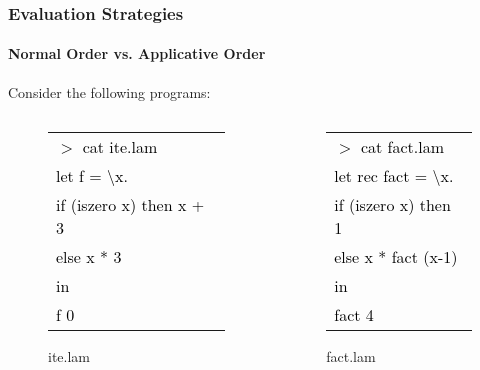 \documentclass[xcolor=table]{beamer}
\newcommand{\tab}{\hspace*{1.2em}}
\begin{document}
\begin{frame}
\frametitle{Evaluation Strategies}
\framesubtitle{Normal Order vs. Applicative Order}
\begin{block}{Consider the following programs:
  \begin{columns}[t] %
     \begin{column}[T]{5cm} %
          \begin{figure}[h!]
				 \begin{footnotesize}
				 \begin{tabular}{l}
				 \textcolor{black}{
			      $>$ cat ite.lam} \\
			      \textcolor{black}{let f = \textbackslash x.} \\ 
			      \textcolor{black}{\tab  if (iszero x) then x + 3} \\
				  \textcolor{black}{\tab  else x * 3} \\
			      \textcolor{black}{in} \\
			      \textcolor{black}{\tab f 0} \\
			      \end{tabular}	
				 \end{footnotesize}
			  \caption{ite.lam}
		 \end{figure}
     \end{column}
     \begin{column}[T]{5cm} %
		 \begin{figure}[h!]
				\begin{footnotesize}
				\rowcolors{1}{gray}{gray}
			  	\begin{tabular}{l}
			  	 \textcolor{black}{
			      $>$ cat fact.lam} \\
			      \textcolor{black}{let rec fact = \textbackslash x. } \\ 
			      \textcolor{black}{\tab if (iszero x) then 1} \\ 
			      \textcolor{black}{\tab else x * fact (x-1)} \\
			      \textcolor{black}{in} \\
			      \textcolor{black}{\tab fact 4} \\
				\end{tabular}	
			  \end{footnotesize}			  
			  \caption{fact.lam}
		 \end{figure}	          
     \end{column}
     \end{columns}
}
\end{block}
\end{frame}
\end{document}
